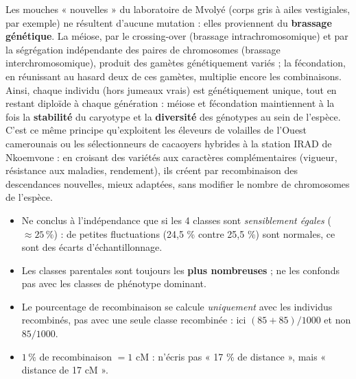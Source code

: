 \documentclass[11pt]{article}
\newcounter{popsec}
\newcounter{popsub}
\newcommand{\courssub}[1]{%
  \stepcounter{popsub}%
  \par\vspace{9pt}\noindent{\popxbold\fontsize{11.5}{13}\selectfont\color{popink}{\color{poporange}\thepopsec.\thepopsub}\hspace{6pt}#1}\par\nopagebreak\vspace{4pt}
}
\begin{document}
\begin{exoresolu}
Les mouches « nouvelles » du laboratoire de Mvolyé (corps gris à ailes vestigiales, par exemple) ne résultent d'aucune mutation : elles proviennent du \textbf{brassage génétique}. La méiose, par le crossing-over (brassage intrachromosomique) et par la ségrégation indépendante des paires de chromosomes (brassage interchromosomique), produit des gamètes génétiquement variés ; la fécondation, en réunissant au hasard deux de ces gamètes, multiplie encore les combinaisons. Ainsi, chaque individu (hors jumeaux vrais) est génétiquement unique, tout en restant diploïde à chaque génération : méiose et fécondation maintiennent à la fois la \textbf{stabilité} du caryotype et la \textbf{diversité} des génotypes au sein de l'espèce. C'est ce même principe qu'exploitent les éleveurs de volailles de l'Ouest camerounais ou les sélectionneurs de cacaoyers hybrides à la station IRAD de Nkoemvone : en croisant des variétés aux caractères complémentaires (vigueur, résistance aux maladies, rendement), ils créent par recombinaison des descendances nouvelles, mieux adaptées, sans modifier le nombre de chromosomes de l'espèce.
\end{exoresolu}

\begin{attention}
\begin{itemize}
\item Ne conclus à l'indépendance que si les 4 classes sont \emph{sensiblement égales} ($\approx 25\,\%$) : de petites fluctuations (24,5 \% contre 25,5 \%) sont normales, ce sont des écarts d'échantillonnage.
\item Les classes parentales sont toujours les \textbf{plus nombreuses} ; ne les confonds pas avec les classes de phénotype dominant.
\item Le pourcentage de recombinaison se calcule \emph{uniquement} avec les individus recombinés, pas avec une seule classe recombinée : ici $(85 + 85)/1000$ et non $85/1000$.
\item $1\,\%$ de recombinaison $= 1$ cM : n'écris pas « 17 \% de distance », mais « distance de 17 cM ».
\end{itemize}
\end{attention}

\courssub{Bilan de l'activité}
\end{document}
